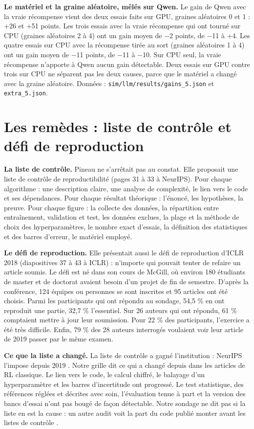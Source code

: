 \documentclass[11pt,a4paper]{article}
\begin{document}
\textbf{Le matériel et la graine aléatoire, mêlés sur Qwen.} Le gain de
Qwen avec la vraie récompense vient des deux essais faits sur GPU,
graines aléatoires 0 et 1 : +26 et +51 points. Les trois essais avec la
vraie récompense qui ont tourné sur CPU (graines aléatoires 2 à 4) ont
un gain moyen de −2 points, de −11 à +4. Les quatre essais sur CPU avec
la récompense tirée au sort (graines aléatoires 1 à 4) ont un gain moyen
de −11 points, de −11 à −10. Sur CPU seul, la vraie récompense n'apporte
à Qwen aucun gain détectable. Deux essais sur GPU contre trois sur CPU
ne séparent pas les deux causes, parce que le matériel a changé avec la
graine aléatoire. Données : \texttt{sim/llm/results/gains\_5.json} et
\texttt{extra\_5.json}.

\section{Les remèdes : liste de contrôle et défi de
reproduction}\label{les-remuxe8des-liste-de-contruxf4le-et-duxe9fi-de-reproduction}

\textbf{La liste de contrôle.} Pineau ne s'arrêtait pas au constat. Elle
proposait une liste de contrôle de reproductibilité (pages 31 à 33 à
NeurIPS). Pour chaque algorithme : une description claire, une analyse
de complexité, le lien vers le code et ses dépendances. Pour chaque
résultat théorique : l'énoncé, les hypothèses, la preuve. Pour chaque
figure : la collecte des données, la répartition entre entraînement,
validation et test, les données exclues, la plage et la méthode de choix
des hyperparamètres, le nombre exact d'essais, la définition des
statistiques et des barres d'erreur, le matériel employé.

\textbf{Le défi de reproduction.} Elle présentait aussi le défi de
reproduction d'ICLR 2018 (diapositives 37 à 43 à ICLR) : n'importe qui
pouvait tenter de refaire un article soumis. Le défi est né dans son
cours de McGill, où environ 180 étudiants de master et de doctorat
avaient besoin d'un projet de fin de semestre. D'après la conférence,
124 équipes ou personnes se sont inscrites et 95 articles ont été
choisis. Parmi les participants qui ont répondu au sondage, 54,5 \% en
ont reproduit une partie, 32,7 \% l'essentiel. Sur 26 auteurs qui ont
répondu, 61 \% comptaient mettre à jour leur soumission. Pour 22 \% des
participants, l'exercice a été très difficile. Enfin, 79 \% des 28
auteurs interrogés voulaient voir leur article de 2019 passer par le
même examen.

\textbf{Ce que la liste a changé.} La liste de contrôle a gagné
l'institution : NeurIPS l'impose depuis 2019
\autocite{pineau2021improving}. Notre grille dit ce qui a changé depuis
dans les articles de RL classique. Le lien vers le code, le calcul
chiffré, le balayage d'un hyperparamètre et les barres d'incertitude ont
progressé. Le test statistique, des références réglées et décrites avec
soin, l'évaluation tenue à part et la version des bancs d'essai n'ont
pas bougé de façon détectable. Notre sondage ne dit pas si la liste en
est la cause : un autre audit voit la part du code publié monter avant
les listes de contrôle \autocite{coakley2026shift}.
\end{document}
